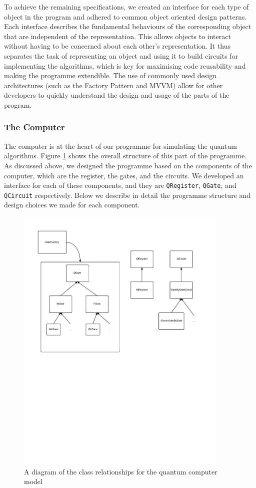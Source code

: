 \documentclass[bibliography=totocnumbered, 10pt]{article}
\theoremstyle{NoticeStyle}
\begin{document}
To achieve the remaining specifications, we created an interface for each type of object in the program and adhered to common object oriented design patterns. Each interface describes the fundamental behaviours of the corresponding object that are independent of the representation. This allows objects to interact without having to be concerned about each other's representation. It thus separates the task of representing an object and using it to build circuits for implementing the algorithms, which is key for maximising code reusability and making the programme extendible. The use of commonly used design architectures (such as the Factory Pattern and MVVM) allow for other developers to quickly understand the design and usage of the parts of the program. 

\subsubsection{The Computer}\label{sec:The Computer}
The computer is at the heart of our programme for simulating the quantum algorithms. Figure \ref{fig:QuantumSimDesign} shows the overall structure of this part of the programme. As discussed above, we designed the programme based on the components of the computer, which are the register, the gates, and the circuits. We developed an interface for each of these components, and they are \texttt{QRegister}, \texttt{QGate}, and \texttt{QCircuit} respectively. Below we describe in detail the programme structure and design choices we made for each component.

\begin{figure}[H]
\centering
\includegraphics[width=0.9\textwidth]{img/QuantumSimDesign.pdf}
\caption{A diagram of the class relationships for the quantum computer model}
\label{fig:QuantumSimDesign}
\end{figure}
\end{document}
